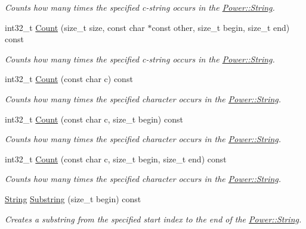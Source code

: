 \begin{DoxyCompactItemize}
\begin{DoxyCompactList}\small\item\em Counts how many times the specified c-\/string occurs in the \hyperlink{class_power_1_1_string}{Power\+::\+String}. \end{DoxyCompactList}\item 
int32\+\_\+t \hyperlink{class_power_1_1_string_a6702dba7258ef6b2fe79a5efd8158be9}{Count} (size\+\_\+t size, const char $\ast$const other, size\+\_\+t begin, size\+\_\+t end) const
\begin{DoxyCompactList}\small\item\em Counts how many times the specified c-\/string occurs in the \hyperlink{class_power_1_1_string}{Power\+::\+String}. \end{DoxyCompactList}\item 
int32\+\_\+t \hyperlink{class_power_1_1_string_aa05ff2dca9ccc4e7f3fe699b0e83edd7}{Count} (const char c) const
\begin{DoxyCompactList}\small\item\em Counts how many times the specified character occurs in the \hyperlink{class_power_1_1_string}{Power\+::\+String}. \end{DoxyCompactList}\item 
int32\+\_\+t \hyperlink{class_power_1_1_string_a39ce333961c1f6e0954b15ac3ce98ab0}{Count} (const char c, size\+\_\+t begin) const
\begin{DoxyCompactList}\small\item\em Counts how many times the specified character occurs in the \hyperlink{class_power_1_1_string}{Power\+::\+String}. \end{DoxyCompactList}\item 
int32\+\_\+t \hyperlink{class_power_1_1_string_a80d14be850156a73d5f99e1c74afb887}{Count} (const char c, size\+\_\+t begin, size\+\_\+t end) const
\begin{DoxyCompactList}\small\item\em Counts how many times the specified character occurs in the \hyperlink{class_power_1_1_string}{Power\+::\+String}. \end{DoxyCompactList}\item 
\hyperlink{class_power_1_1_string}{String} \hyperlink{class_power_1_1_string_a754d4d67de005b89aba041db5f551e1c}{Substring} (size\+\_\+t begin) const
\begin{DoxyCompactList}\small\item\em Creates a substring from the specified start index to the end of the \hyperlink{class_power_1_1_string}{Power\+::\+String}. \end{DoxyCompactList}\item 

\end{DoxyCompactItemize}
